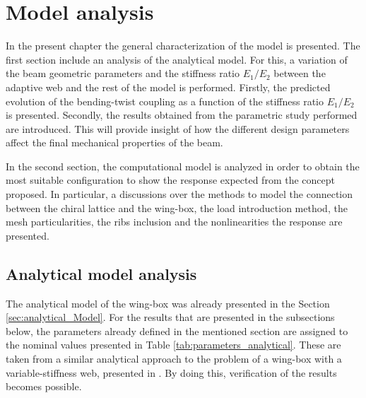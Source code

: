 \chapter{Model analysis} \label{chap:Results_model}
%
  
  In the present chapter the general characterization of the model is presented. The first section include an analysis of the analytical model. For this, a variation of the beam geometric parameters and the stiffness ratio $E_1/E_2$ between the adaptive web and the rest of the model is performed. Firstly, the predicted evolution of the bending-twist coupling as a function of the stiffness ratio $E_1/E_2$ is presented. Secondly, the results obtained from the parametric study performed are introduced. This will provide insight of how the different design parameters affect the final mechanical properties of the beam.

  In the second section, the computational model is analyzed in order to obtain the most suitable configuration to show the response expected from the concept proposed. In particular, a discussions over the methods to model the connection between the chiral lattice and the wing-box, the load introduction method, the mesh particularities, the ribs inclusion and the nonlinearities the response are presented. 

\section{Analytical model analysis} \label{sec:analyticalParametricStudy_results_model}

  The analytical model of the wing-box was already presented in the Section \ref{sec:analytical_Model}. For the results that are presented in the subsections below, the parameters already defined in the mentioned section are assigned to the nominal values presented in Table \ref{tab:parameters_analytical}. These are taken from a similar analytical approach to the problem of a wing-box with a variable-stiffness web, presented in \cite{Raither2013a}. By doing this, verification of the results becomes possible.

